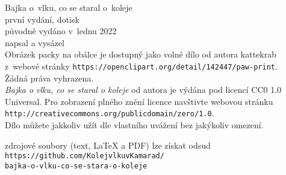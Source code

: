 \documentclass[a5paper, twoside,12pt]{book}
\begin{document}
\thispagestyle{empty}
\vspace*{\fill}
\begin{center}
    Bajka o~vlku, co se staral o~koleje\\
    \vspace{\baselineskip}
    první vydání, dotisk\\
    původně vydáno v~lednu 2022\\
    \vspace{\baselineskip}
    napsal a vysázel \\
    \vspace{\baselineskip}
    Obrázek packy na obálce je dostupný jako volné dílo od autora kattekrab z~webové stránky \texttt{https://openclipart.org/detail/142447/paw-print}.\\
    \vspace{\baselineskip}
    Žádná práva vyhrazena.\\
    \emph{Bajka o vlku, co se staral o koleje} od autora  je výdána pod licencí CC0 1.0 Universal. Pro zobrazení plného znění licence navštivte webovou stránku \texttt{http://creativecommons.org/publicdomain/zero/1.0}.\\
    Dílo můžete jakkoliv užít dle vlastního uvážení bez jakýkoliv omezení.\\
    
\end{center}
\vspace*{\fill}
\begin{center}
zdrojové soubory (text, \LaTeX{} a PDF) lze získat odsud\\
\texttt{https://github.com/KolejvlkuvKamarad/\\bajka-o-vlku-co-se-stara-o-koleje}\\
\end{center}
\newpage

\thispagestyle{empty}
\vspace*{\fill}
\begin{center}
    
\end{center}
\vspace*{\fill}
\end{document}
